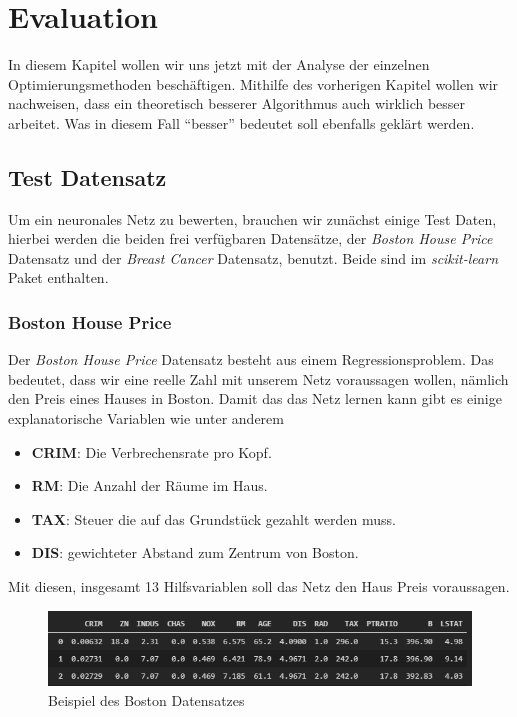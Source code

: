 \section{Evaluation}\label{Evaluation}

In diesem Kapitel wollen wir uns jetzt mit der Analyse der einzelnen 
Optimierungsmethoden beschäftigen. Mithilfe des vorherigen Kapitel wollen
wir nachweisen, dass ein theoretisch besserer Algorithmus auch wirklich besser 
arbeitet. Was in diesem Fall ``besser'' bedeutet soll ebenfalls geklärt werden.

\subsection{Test Datensatz} \label{Test Datensatz}

Um ein neuronales Netz zu bewerten, brauchen wir zunächst einige Test Daten,
hierbei werden die beiden frei verfügbaren Datensätze, der \textit{Boston House Price}
Datensatz und der \textit{Breast Cancer} Datensatz, benutzt. Beide sind im \textit{scikit-learn}
Paket \cite{scikit-learn} enthalten. 

\subsubsection{Boston House Price} \label{Boston House Price}

Der \textit{Boston House Price} Datensatz besteht aus einem Regressionsproblem.
Das bedeutet, dass wir eine reelle Zahl mit unserem Netz voraussagen wollen, nämlich den
Preis eines Hauses in Boston. Damit das das  Netz lernen kann gibt es einige 
explanatorische Variablen wie unter anderem

\begin{itemize}
    \item \textbf{CRIM}: Die Verbrechensrate pro Kopf.
    \item \textbf{RM}: Die Anzahl der Räume im Haus.
    \item \textbf{TAX}: Steuer die auf das Grundstück gezahlt werden muss.
    \item \textbf{DIS}: gewichteter Abstand zum Zentrum von Boston. 
\end{itemize}

Mit diesen, insgesamt 13 Hilfsvariablen soll das Netz den Haus Preis voraussagen.

\begin{figure}[htbp] 
    \centering
       \includegraphics[width=1.0\textwidth]{abb/BostonBeispiel.PNG}
    \caption{Beispiel des Boston Datensatzes}
    \label{fig:BostonBeispiel}
\end{figure}


